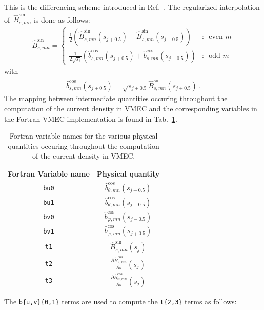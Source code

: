 %
This is the differencing scheme introduced in Ref.~\cite{hirshman_schwenn_nuehrenberg_1990}.
%
The regularized interpolation of~$\hat{B}_{s,mn}^\mathrm{sin}$ is done as follows:
\begin{align}
 \hat{B}_{s,mn}^\mathrm{sin}
 = \begin{cases}
    \frac{1}{2} \left( \hat{B}_{s, mn}^\mathrm{sin}(s_{j+0.5}) + \hat{B}_{s, mn}^\mathrm{sin}(s_{j-0.5}) \right) &:\, \textrm{ even } m \\
    \frac{1}{2 \sqrt{s_j}} \left(
        \hat{b}_{s, mn}^\mathrm{cos}(s_{j+0.5})
      + \hat{b}_{s, mn}^\mathrm{cos}(s_{j-0.5}) \right) &:\, \textrm{ odd } m
   \end{cases}
\end{align}
with
\begin{align}
 \hat{b}_{s, mn}^\mathrm{cos}(s_{j+0.5})
 = \sqrt{s_{j+0.5}} \hat{B}_{s,mn}^\mathrm{sin}(s_{j+0.5}) \, .
\end{align}
%
The mapping between intermediate quantities occuring throughout the computation of the current density in VMEC
and the corresponding variables in the Fortran VMEC implementation is found in Tab.~\ref{tab:compute_currents_vars}.
\begin{table}[tb]
 \centering
 \begin{tabular}{|c|c|}
  \hline
  Fortran Variable name & Physical quantity \\
  \hline
  \texttt{bu0} & $\hat{b}_{\theta, mn}^\mathrm{cos}(s_{j-0.5})$ \\
  \texttt{bu1} & $\hat{b}_{\theta, mn}^\mathrm{cos}(s_{j+0.5})$ \\
  \texttt{bv0} & $\hat{b}_{\varphi, mn}^\mathrm{cos}(s_{j-0.5})$ \\
  \texttt{bv1} & $\hat{b}_{\varphi, mn}^\mathrm{cos}(s_{j+0.5})$ \\
  \hline
  \texttt{t1} & $\hat{B}_{s,mn}^\mathrm{sin} (s_j)$ \\
  \texttt{t2} & $\frac{\partial \hat{B}_{\theta, mn}^\mathrm{cos}}{\partial s} (s_j)$ \\
  \texttt{t3} & $\frac{\partial \hat{B}_{\varphi, mn}^\mathrm{cos}}{\partial s} (s_j)$ \\
  \hline
 \end{tabular}
 \caption{Fortran variable names for the various physical quantities
          occuring throughout the computation of the current density in VMEC.}
 \label{tab:compute_currents_vars}
\end{table}
%
The \texttt{b\{u,v\}\{0,1\}} terms are used to compute the \texttt{t\{2,3\}} terms as follows:
